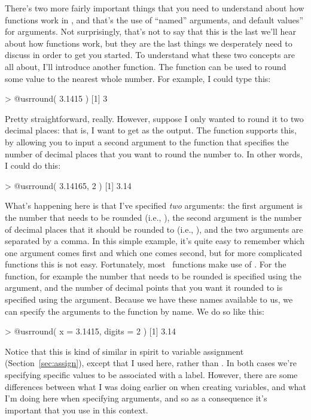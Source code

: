 There's two more fairly important things that you need to understand about how functions work in \R, and that's the use of ``named'' arguments, and 		default values'' for arguments. Not surprisingly, that's not to say that this is the last we'll hear about how functions work, but they are the last things we desperately need to discuss in order to get you started. To understand what these two concepts are all about, I'll introduce another function. The  function can be used to round some value to the nearest whole number. For example, I could type this:
\begin{rblock1}
> @usr{round( 3.1415 )}
[1] 3
\end{rblock1}
Pretty straightforward, really. However, suppose I only wanted to round it to two decimal places: that is, I want to get  as the output. The  function supports this, by allowing you to input a second argument to the function that specifies the number of decimal places that you want to round the number to. In other words, I could do this: 
\begin{rblock1}
> @usr{round( 3.14165, 2 )}
[1] 3.14
\end{rblock1}
What's happening here is that I've specified {\it two} arguments: the first argument is the number that needs to be rounded (i.e., ), the second argument is the number of decimal places that it should be rounded to (i.e., ), and the two arguments are separated by a comma. In this simple example, it's quite easy to remember which one argument comes first and which one comes second, but for more complicated functions this is not easy. Fortunately, most \R\ functions make use of . For the  function, for example the number that needs to be rounded is specified using the  argument, and the number of decimal points that you want it rounded to is specified using the  argument. Because we have these names available to us, we can specify the arguments to the function by name. We do so like this:
\begin{rblock1}
> @usr{round( x = 3.1415, digits = 2 )}
[1] 3.14
\end{rblock1}
Notice that this is kind of similar in spirit to variable assignment (Section~\ref{sec:assign}), except that I used \rtext{=} here, rather than \rtext{<-}. In both cases we're specifying specific values to be associated with a label. However, there are some differences between what I was doing earlier on when creating variables, and what I'm doing here when specifying arguments, and so as a consequence it's important that you use \rtext{=} in this context.


